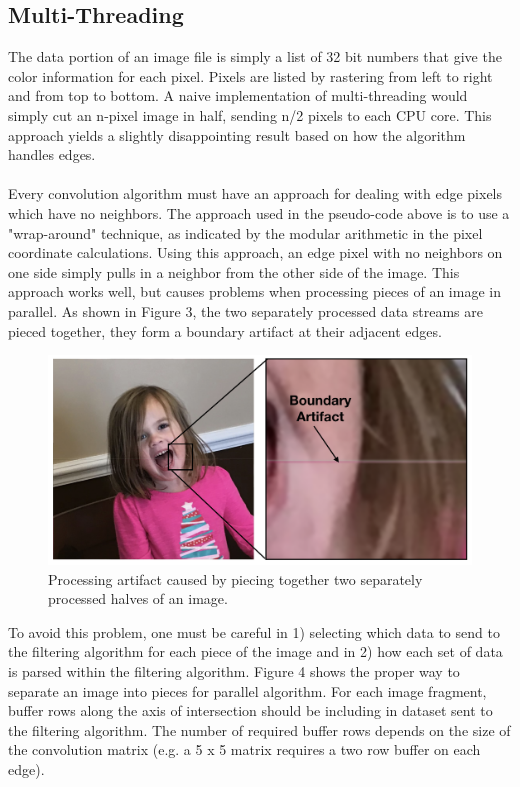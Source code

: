 \documentclass{article} %
\begin{document}
\subsection{Multi-Threading}
The data portion of an image file is simply a list of 32 bit numbers that give the color information for each pixel.  Pixels are listed by rastering from left to right and from top to bottom.  A naive implementation of multi-threading would simply cut an n-pixel image in half, sending n/2 pixels to each CPU core.  This approach yields a slightly disappointing result based on how the algorithm handles edges. \\
\\
Every convolution algorithm must have an approach for dealing with edge pixels which have no neighbors. The approach used in the pseudo-code above is to use a "wrap-around" technique, as indicated by the modular arithmetic in the pixel coordinate calculations.  Using this approach, an edge pixel with no neighbors on one side simply pulls in a neighbor from the other side of the image.  This approach works well, but causes problems when processing pieces of an image in parallel. As shown in Figure 3, the two separately processed data streams are pieced together, they form a boundary artifact at their adjacent edges.   

\begin{figure}[ht!]
\centering
\includegraphics[width=120mm]{boundary.png}
\caption{Processing artifact caused by piecing together two separately processed halves of an image.\label{overflow}}
\end{figure}


To avoid this problem, one must be careful in 1) selecting which data to send to the filtering algorithm for each piece of the image and in 2) how each set of data is parsed within the filtering algorithm.  Figure 4 shows the proper way to separate an image into pieces for parallel algorithm.  For each image fragment, buffer rows along the axis of intersection should be including in dataset sent to the filtering algorithm.  The number of required buffer rows depends on the size of the convolution matrix (e.g. a 5 x 5 matrix requires a two row buffer on each edge). \\
\end{document}
